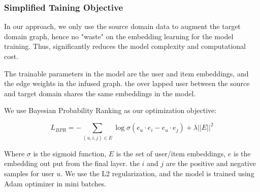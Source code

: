 \subsubsection{Simplified Taining Objective}

In our approach, we only use the source domain data to augment the target domain graph, hence no "waste" on the embedding learning for the model training. Thus, significantly reduces the model complexity and computational cost.

The trainable parameters in the model are the user and item embeddings, and the edge weights in the infused graph. the over lapped user between the source and target domain shares the same embeddings in the model.

We use Bayesian Probability Ranking as our optimization objective:

\begin{equation}
    L_{BPR} = -\sum\limits_{(u, i, j) \in E} \log \sigma(e_u \cdot e_i - e_u \cdot e_j)+  \lambda||E||^2
\end{equation}

Where $\sigma$ is the sigmoid function, $E$ is the set of user/item embeddings, $e$ is the embedding out put from the final layer. the $i$ and $j$ are the positive and negative samples for user $u$.
We use the L2 regularization, and the model is trained using Adam optimizer in mini batches.
